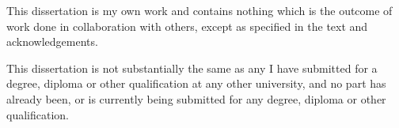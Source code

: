 \begin{declaration}

This dissertation is my own work and contains nothing which is the outcome of work done in collaboration with others, except as specified in the text and acknowledgements.

This dissertation is not substantially the same as any I have submitted for a degree, diploma or other qualification at any other university, and no part has already been, or is currently being submitted for any degree, diploma or other qualification.

\end{declaration}
